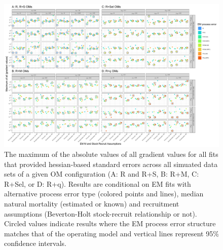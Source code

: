 \documentclass[
  12pt,
]{article}
\begin{document}
\begin{landscape}
\begin{figure}
\begin{center}
\includegraphics{hess_grad_convergence_plots}
\end{center}
\caption{The maximum of the absolute values of all gradient values for all fits that provided hessian-based standard errors across all simuated data sets of a given OM configuration (A: R and R+S, B: R+M, C: R+Sel, or D: R+q).  Results are conditional on EM fits with alternative process error type (colored points and lines), median natural mortality (estimated or known) and recruitment assumptions (Beverton-Holt stock-recruit relationship or not). Circled values indicate results where the EM process error structure matches that of the operating model and vertical lines represent 95\% confidence intervals.}\label{hess_grad}
\end{figure}
\end{landscape}
\end{document}
